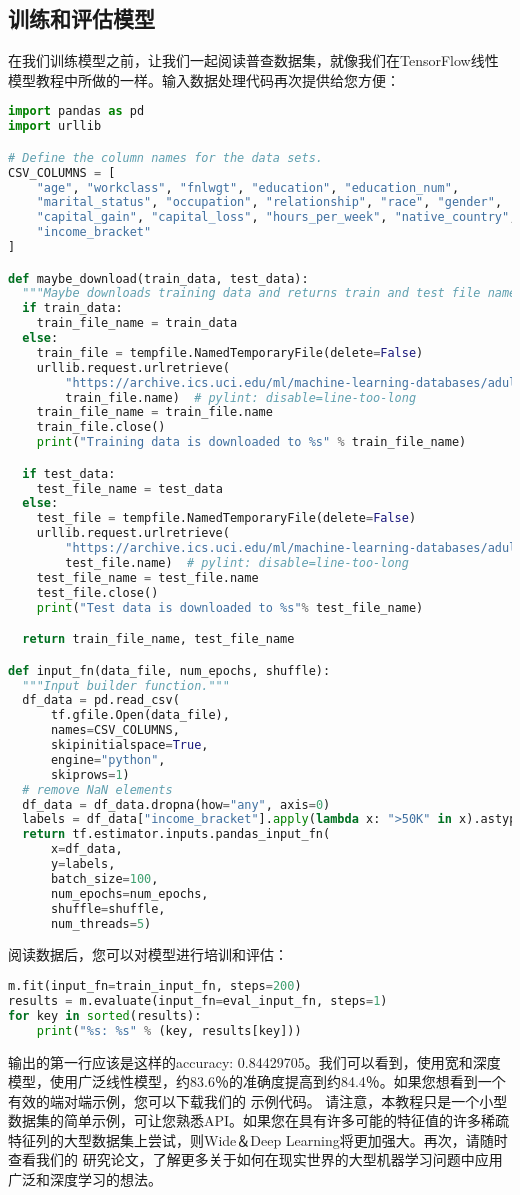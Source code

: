\subsection{训练和评估模型}
在我们训练模型之前，让我们一起阅读普查数据集，就像我们在TensorFlow线性模型教程中所做的一样。输入数据处理代码再次提供给您方便：
\begin{lstlisting}[language=Python]
import pandas as pd
import urllib

# Define the column names for the data sets.
CSV_COLUMNS = [
    "age", "workclass", "fnlwgt", "education", "education_num",
    "marital_status", "occupation", "relationship", "race", "gender",
    "capital_gain", "capital_loss", "hours_per_week", "native_country",
    "income_bracket"
]

def maybe_download(train_data, test_data):
  """Maybe downloads training data and returns train and test file names."""
  if train_data:
    train_file_name = train_data
  else:
    train_file = tempfile.NamedTemporaryFile(delete=False)
    urllib.request.urlretrieve(
        "https://archive.ics.uci.edu/ml/machine-learning-databases/adult/adult.data",
        train_file.name)  # pylint: disable=line-too-long
    train_file_name = train_file.name
    train_file.close()
    print("Training data is downloaded to %s" % train_file_name)

  if test_data:
    test_file_name = test_data
  else:
    test_file = tempfile.NamedTemporaryFile(delete=False)
    urllib.request.urlretrieve(
        "https://archive.ics.uci.edu/ml/machine-learning-databases/adult/adult.test",
        test_file.name)  # pylint: disable=line-too-long
    test_file_name = test_file.name
    test_file.close()
    print("Test data is downloaded to %s"% test_file_name)

  return train_file_name, test_file_name

def input_fn(data_file, num_epochs, shuffle):
  """Input builder function."""
  df_data = pd.read_csv(
      tf.gfile.Open(data_file),
      names=CSV_COLUMNS,
      skipinitialspace=True,
      engine="python",
      skiprows=1)
  # remove NaN elements
  df_data = df_data.dropna(how="any", axis=0)
  labels = df_data["income_bracket"].apply(lambda x: ">50K" in x).astype(int)
  return tf.estimator.inputs.pandas_input_fn(
      x=df_data,
      y=labels,
      batch_size=100,
      num_epochs=num_epochs,
      shuffle=shuffle,
      num_threads=5)
\end{lstlisting}
阅读数据后，您可以对模型进行培训和评估：
\begin{lstlisting}[language=Python]
m.fit(input_fn=train_input_fn, steps=200)
results = m.evaluate(input_fn=eval_input_fn, steps=1)
for key in sorted(results):
    print("%s: %s" % (key, results[key]))
\end{lstlisting}
输出的第一行应该是这样的accuracy: 0.84429705。我们可以看到，使用宽和深度模型，使用广泛线性模型，约83.6％的准确度提高到约84.4％。如果您想看到一个有效的端对端示例，您可以下载我们的 示例代码。
请注意，本教程只是一个小型数据集的简单示例，可让您熟悉API。如果您在具有许多可能的特征值的许多稀疏特征列的大型数据集上尝试，则Wide＆Deep Learning将更加强大。再次，请随时查看我们的 研究论文，了解更多关于如何在现实世界的大型机器学习问题中应用广泛和深度学习的想法。
